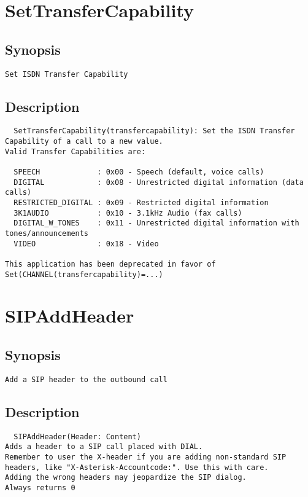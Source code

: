 \section{SetTransferCapability}
\subsection{Synopsis}
\begin{verbatim}
Set ISDN Transfer Capability
\end{verbatim}
\subsection{Description}
\begin{verbatim}
  SetTransferCapability(transfercapability): Set the ISDN Transfer 
Capability of a call to a new value.
Valid Transfer Capabilities are:

  SPEECH             : 0x00 - Speech (default, voice calls)
  DIGITAL            : 0x08 - Unrestricted digital information (data calls)
  RESTRICTED_DIGITAL : 0x09 - Restricted digital information
  3K1AUDIO           : 0x10 - 3.1kHz Audio (fax calls)
  DIGITAL_W_TONES    : 0x11 - Unrestricted digital information with tones/announcements
  VIDEO              : 0x18 - Video

This application has been deprecated in favor of Set(CHANNEL(transfercapability)=...)

\end{verbatim}


\section{SIPAddHeader}
\subsection{Synopsis}
\begin{verbatim}
Add a SIP header to the outbound call
\end{verbatim}
\subsection{Description}
\begin{verbatim}
  SIPAddHeader(Header: Content)
Adds a header to a SIP call placed with DIAL.
Remember to user the X-header if you are adding non-standard SIP
headers, like "X-Asterisk-Accountcode:". Use this with care.
Adding the wrong headers may jeopardize the SIP dialog.
Always returns 0

\end{verbatim}


